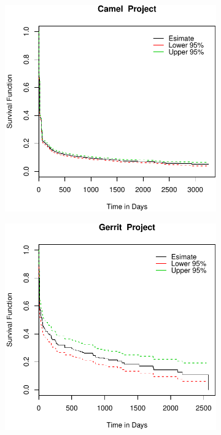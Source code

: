 
\begin{figure}[t]
	\centering
	
	\begin{subfigure}[b]{0.195\textwidth}
		\includegraphics[width=\textwidth]{figures/Survival/camel.pdf}
	\end{subfigure}
	\begin{subfigure}[b]{0.195\textwidth}
		\includegraphics[width=\textwidth]{figures/Survival/gerrit.pdf}

\end{subfigure}
\end{figure}
